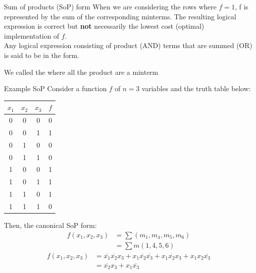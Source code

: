 \begin{parag}{Sum of products (SoP) form}
   When we are considering the rows where $f = 1$, f is represented by the sum of the corresponding minterms. The resulting logical expression is correct but \textbf{not} necessarily the lowest cost (optimal) implementation of $f$. \\
   Any logical expression consisting of product (AND) terms that are summed (OR) is said to be in the  form.
   \begin{definition}
       We called the  where all the product are a minterm
   \end{definition}
   
 \begin{subparag}{Example SoP}
     Consider a function $f$ of $ n = 3$ variables and the truth table below:
     \begin{center}
     \begin{tabular}{ccc|c}
         \hline
         $x_1$ & $x_2$ & $x_3$ & $f$ \\
         \hline
         \hline
         0 & 0 & 0 & 0 \\
         \hline
         0 & 0 & 1 & 1\\
         \hline
         0 & 1 & 0 & 0 \\
         \hline
         0 & 1 & 1 & 0 \\
         \hline
         1 & 0 & 0 & 1 \\
         \hline
         1 & 0 & 1 & 1 \\
         \hline
         1 & 1 & 0 & 1 \\
         \hline
         1 & 1 & 1 & 0 \\
         \hline
     \end{tabular}
     \end{center}
    Then, the canonical  SoP form:
    \begin{align*}
        f(x_1, x_2, x_3) &= \sum(m_1, m_4, m_5, m_6) \\
                         &= \sum m(1, 4, 5, 6)
    \end{align*}
    \begin{align*}
        f(x_1, x_2, x_3) &= \overline{x_1} \overline{x_2} x_3 + x_1 \overline{x_2} \overline{x_3} + x_1 \overline{x_2} x_3 + x_1 x_2 \overline{x_3} \\
                         &= \overline{x_2} x_3 + x_1 \overline{x_3}
    \end{align*}

\end{subparag}
\end{parag}
